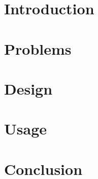 \documentclass{article}
\begin{document}

\section{Introduction}


\section{Problems}


\section{Design}


\section{Usage}


\section{Conclusion}

\end{document}
